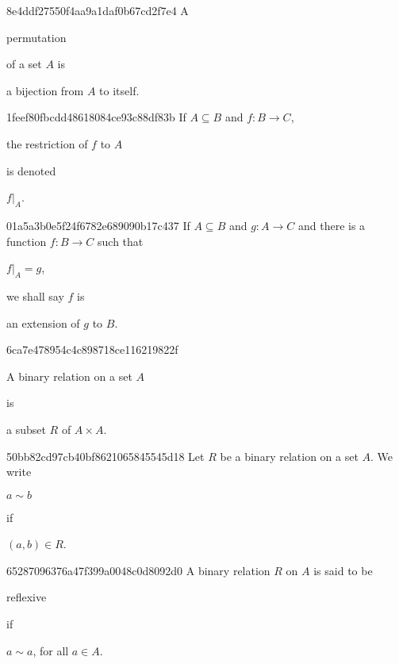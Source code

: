 \begin{note}{8e4ddf27550f4aa9a1daf0b67cd2f7e4}
    A \begin{icloze}{2}permutation\end{icloze} of a set \({ A }\) is \begin{icloze}{1}a bijection from \({ A }\) to itself.\end{icloze}
\end{note}

\begin{note}{1feef80fbcdd48618084ce93c88df83b}
    If \({ A \subseteq B  }\) and \({ f : B \to C }\), \begin{icloze}{2}the restriction of \({ f }\) to \({ A }\)\end{icloze} is denoted \begin{icloze}{1}\({ f|_{A} }\).\end{icloze}
\end{note}

\begin{note}{01a5a3b0e5f24f6782e689090b17c437}
    If \({ A \subseteq B }\) and \({ g : A \to C }\) and there is a function \({ f : B \to C }\) such that \begin{icloze}{2}\({ f|_{A} = g }\),\end{icloze} we shall say \({ f }\) is \begin{icloze}{1}an extension of \({ g }\) to \({ B }\).\end{icloze}
\end{note}

\begin{note}{6ca7e478954c4c898718ce116219822f}
    \begin{icloze}{2}A binary relation on a set \({ A }\)\end{icloze} is \begin{icloze}{1}a subset \({ R }\) of \({ A \times A }\).\end{icloze}
\end{note}

\begin{note}{50bb82cd97cb40bf8621065845545d18}
    Let \({ R }\) be a binary relation on a set \({ A }\).
    We write \begin{icloze}{2}\({ a \sim b }\)\end{icloze} if \begin{icloze}{1}\({ (a, b) \in R }\).\end{icloze}
\end{note}

\begin{note}{65287096376a47f399a0048c0d8092d0}
    A binary relation \({ R }\) on \({ A }\) is said to be \begin{icloze}{2}reflexive\end{icloze} if
    \begin{icloze}{1}
        \begin{center}
            \({ a \sim a }\), for all \({ a \in A }\).
        \end{center}
    \end{icloze}
\end{note}

